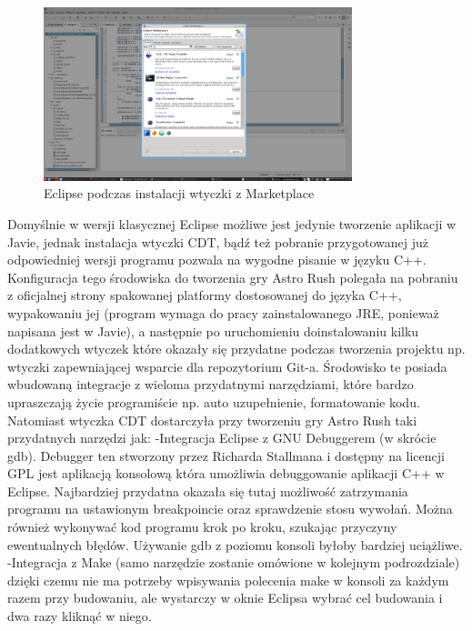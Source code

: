 \begin{figure}[h]
    \centering
    \includegraphics[width=0.8\textwidth,natwidth=480,natheight=142]{./Pictures/eclipse.png}
    \caption{Eclipse podczas instalacji wtyczki z Marketplace}
\end{figure}

Domyślnie w wersji klasycznej Eclipse możliwe jest jedynie tworzenie aplikacji w Javie, jednak instalacja wtyczki CDT, bądź też pobranie przygotowanej już odpowiedniej wersji programu pozwala na wygodne pisanie w języku C++.
Konfiguracja tego środowiska do tworzenia gry Astro Rush polegała na pobraniu z oficjalnej strony spakowanej platformy dostosowanej do języka C++, wypakowaniu jej (program wymaga do pracy zainstalowanego JRE, ponieważ napisana jest w Javie), a następnie po uruchomieniu doinstalowaniu kilku dodatkowych wtyczek które okazały się przydatne podczas tworzenia projektu np. wtyczki zapewniającej wsparcie dla repozytorium Git-a. Środowisko te posiada wbudowaną integracje z wieloma przydatnymi narzędziami, które bardzo upraszczają życie programiście np. auto uzupełnienie, formatowanie kodu. Natomiast wtyczka CDT dostarczyła przy tworzeniu gry Astro Rush taki przydatnych narzędzi jak:
-Integracja Eclipse z GNU Debuggerem (w skrócie gdb). Debugger ten stworzony przez Richarda Stallmana i dostępny na licencji GPL jest aplikacją konsolową która umożliwia debuggowanie aplikacji C++ w Eclipse. Najbardziej przydatna okazała się tutaj możliwość zatrzymania programu na ustawionym breakpoincie oraz sprawdzenie stosu wywołań. Można również wykonywać kod programu krok po kroku, szukając przyczyny ewentualnych błędów. Używanie gdb z poziomu konsoli byłoby bardziej uciążliwe. 
-Integracja z Make (samo narzędzie zostanie omówione w kolejnym podrozdziale) dzięki czemu nie ma potrzeby wpisywania polecenia make w konsoli za każdym razem przy budowaniu, ale wystarczy w oknie Eclipsa wybrać cel budowania i dwa razy kliknąć w niego.

